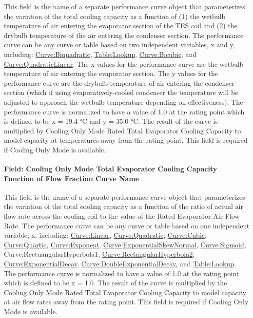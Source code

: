 This field is the name of a separate performance curve object that parameterizes the variation of the total cooling capacity as a function of (1) the wetbulb temperature of air entering the evaporator section of the TES coil and (2) the drybulb temperature of the air entering the condenser section. The performance curve can be any curve or table based on two independent variables, x and y, including: \hyperref[curvebiquadratic]{Curve:Biquadratic}, \hyperref[tablelookup]{Table:Lookup}, \hyperref[curvebicubic]{Curve:Bicubic}, and \hyperref[curvequadraticlinear]{Curve:QuadraticLinear}. The x values for the performance curve are the wetbulb temperature of air entering the evaporator section. The y values for the performance curve are the drybulb temperature of air entering the condenser section (which if using evaporatively-cooled condenser the temperature will be adjusted to approach the wetbulb temperature depending on effectiveness). The performance curve is normalized to have a value of 1.0 at the rating point which is defined to be x = 19.4 °C and y = 35.0 °C. The result of the curve is multiplied by Cooling Only Mode Rated Total Evaporator Cooling Capacity to model capacity at temperatures away from the rating point. This field is required if Cooling Only Mode is available.

\paragraph{Field: Cooling Only Mode Total Evaporator Cooling Capacity Function of Flow Fraction Curve Name}\label{field-cooling-only-mode-total-evaporator-cooling-capacity-function-of-flow-fraction-curve-name}

This field is the name of a separate performance curve object that parameterizes the variation of the total cooling capacity as a function of the ratio of actual air flow rate across the cooling coil to the value of the Rated Evaporator Air Flow Rate. The performance curve can be any curve or table based on one independent variable, x, including: \hyperref[curvelinear]{Curve:Linear}, \hyperref[curvequadratic]{Curve:Quadratic}, \hyperref[curvecubic]{Curve:Cubic}, \hyperref[curvequartic]{Curve:Quartic}, \hyperref[curveexponent]{Curve:Exponent}, \hyperref[curveexponentialskewnormal]{Curve:ExponentialSkewNormal}, \hyperref[curvesigmoid]{Curve:Sigmoid}, Curve:RectuangularHyperbola1, \hyperref[curverectangularhyperbola2]{Curve:RectangularHyperbola2}, \hyperref[curveexponentialdecay]{Curve:ExponentialDecay}, \hyperref[curvedoubleexponentialdecay]{Curve:DoubleExponentialDecay}, and \hyperref[tablelookup]{Table:Lookup}. The performance curve is normalized to have a value of 1.0 at the rating point which is defined to be x = 1.0. The result of the curve is multiplied by the Cooling Only Mode Rated Total Evaporator Cooling Capacity to model capacity at air flow rates away from the rating point. This field is required if Cooling Only Mode is available.

